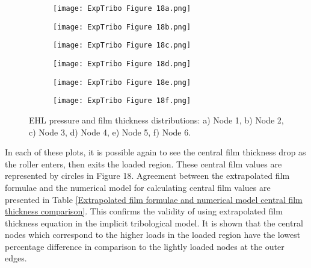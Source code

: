 \begin{figure}
	\centering
	\begin{subfigure}[b]{0.49\textwidth}
		\centering
		\texttt{[image: ExpTribo Figure 18a.png]}
		\caption{}
		\label{NodeA}
	\end{subfigure}
	\hfill
	\begin{subfigure}[b]{0.49\textwidth}
		\centering
		\texttt{[image: ExpTribo Figure 18b.png]}
		\caption{}
		\label{NodeB}
	\end{subfigure}
	\hfill
	\begin{subfigure}[b]{0.49\textwidth}
		\centering
		\texttt{[image: ExpTribo Figure 18c.png]}
		\caption{}
		\label{NodeC}
	\end{subfigure}
	\hfill
	\begin{subfigure}[b]{0.49\textwidth}
		\centering
		\texttt{[image: ExpTribo Figure 18d.png]}
		\caption{}
		\label{NodeD}
	\end{subfigure}
	\hfill
	\begin{subfigure}[b]{0.49\textwidth}
		\centering
		\texttt{[image: ExpTribo Figure 18e.png]}
		\caption{}
		\label{NodeE}
	\end{subfigure}
	\hfill
	\begin{subfigure}[b]{0.49\textwidth}
		\centering
		\texttt{[image: ExpTribo Figure 18f.png]}
		\caption{}
		\label{NodeF}
	\end{subfigure}
	\caption{EHL pressure and film thickness distributions: a) Node 1, b) Node 2, c) Node 3, d) Node 4, e) Node 5, f) Node 6.}
	\label{EHL pressure and film thickness distributions}
\end{figure}

In each of these plots, it is possible again to see the central film thickness drop as the roller enters, then exits the loaded region. These central film values are represented by circles in Figure 18. Agreement between the extrapolated film formulae and the numerical model for calculating central film values are presented in Table \ref{Extrapolated film formulae and numerical model central film thickness comparison}. This confirms the validity of using extrapolated film thickness equation in the implicit tribological model. It is shown that the central nodes which correspond to the higher loads in the loaded region have the lowest percentage difference in comparison to the lightly loaded nodes at the outer edges.

